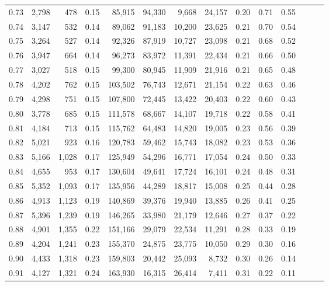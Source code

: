 \begin{tabular}{rrrrrrrrrrrrrr}
0.73 &  2,798 &    478 &  0.15 &   85,915 &   94,330 &   9,668 &  24,157 &  0.20 &  0.71 &      0.55 \\
0.74 &  3,147 &    532 &  0.14 &   89,062 &   91,183 &  10,200 &  23,625 &  0.21 &  0.70 &      0.54 \\
0.75 &  3,264 &    527 &  0.14 &   92,326 &   87,919 &  10,727 &  23,098 &  0.21 &  0.68 &      0.52 \\
0.76 &  3,947 &    664 &  0.14 &   96,273 &   83,972 &  11,391 &  22,434 &  0.21 &  0.66 &      0.50 \\
0.77 &  3,027 &    518 &  0.15 &   99,300 &   80,945 &  11,909 &  21,916 &  0.21 &  0.65 &      0.48 \\
0.78 &  4,202 &    762 &  0.15 &  103,502 &   76,743 &  12,671 &  21,154 &  0.22 &  0.63 &      0.46 \\
0.79 &  4,298 &    751 &  0.15 &  107,800 &   72,445 &  13,422 &  20,403 &  0.22 &  0.60 &      0.43 \\
0.80 &  3,778 &    685 &  0.15 &  111,578 &   68,667 &  14,107 &  19,718 &  0.22 &  0.58 &      0.41 \\
0.81 &  4,184 &    713 &  0.15 &  115,762 &   64,483 &  14,820 &  19,005 &  0.23 &  0.56 &      0.39 \\
0.82 &  5,021 &    923 &  0.16 &  120,783 &   59,462 &  15,743 &  18,082 &  0.23 &  0.53 &      0.36 \\
0.83 &  5,166 &  1,028 &  0.17 &  125,949 &   54,296 &  16,771 &  17,054 &  0.24 &  0.50 &      0.33 \\
0.84 &  4,655 &    953 &  0.17 &  130,604 &   49,641 &  17,724 &  16,101 &  0.24 &  0.48 &      0.31 \\
0.85 &  5,352 &  1,093 &  0.17 &  135,956 &   44,289 &  18,817 &  15,008 &  0.25 &  0.44 &      0.28 \\
0.86 &  4,913 &  1,123 &  0.19 &  140,869 &   39,376 &  19,940 &  13,885 &  0.26 &  0.41 &      0.25 \\
0.87 &  5,396 &  1,239 &  0.19 &  146,265 &   33,980 &  21,179 &  12,646 &  0.27 &  0.37 &      0.22 \\
0.88 &  4,901 &  1,355 &  0.22 &  151,166 &   29,079 &  22,534 &  11,291 &  0.28 &  0.33 &      0.19 \\
0.89 &  4,204 &  1,241 &  0.23 &  155,370 &   24,875 &  23,775 &  10,050 &  0.29 &  0.30 &      0.16 \\
0.90 &  4,433 &  1,318 &  0.23 &  159,803 &   20,442 &  25,093 &   8,732 &  0.30 &  0.26 &      0.14 \\
0.91 &  4,127 &  1,321 &  0.24 &  163,930 &   16,315 &  26,414 &   7,411 &  0.31 &  0.22 &      0.11 \\

\end{tabular}
